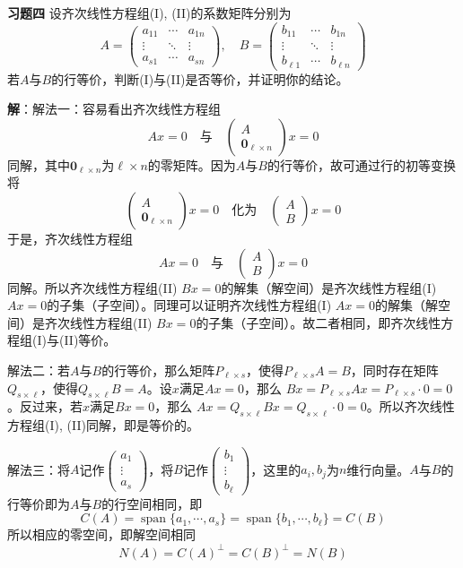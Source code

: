 \newpageorvspace

{\bf 习题四} 设齐次线性方程组(I), (II)的系数矩阵分别为
$$A = \begin{pmatrix} a_{11} & \cdots & a_{1n} \\ \vdots & \ddots & \vdots \\ a_{s1} & \cdots & a_{sn} \end{pmatrix}, \quad B = \begin{pmatrix} b_{11} & \cdots & b_{1n} \\ \vdots & \ddots & \vdots \\ b_{\ell 1} & \cdots & b_{\ell n} \end{pmatrix}$$
若$A$与$B$的行等价，判断(I)与(II)是否等价，并证明你的结论。

{\bf 解}：解法一：容易看出齐次线性方程组
$$Ax = 0 \quad \text{与} \quad \begin{pmatrix} A \\ \mathbf{0}_{\ell\times n} \end{pmatrix} x = 0$$
同解，其中$\mathbf{0}_{\ell\times n}$为$\ell\times n$的零矩阵。因为$A$与$B$的行等价，故可通过行的初等变换将
$$\begin{pmatrix} A \\ \mathbf{0}_{\ell\times n} \end{pmatrix} x = 0 \quad \text{化为} \quad \begin{pmatrix} A \\ B \end{pmatrix} x = 0$$
于是，齐次线性方程组
$$Ax = 0 \quad \text{与} \quad \begin{pmatrix} A \\ B \end{pmatrix} x = 0$$
同解。所以齐次线性方程组(II) $Bx = 0$的解集（解空间）是齐次线性方程组(I) $Ax = 0$的子集（子空间）。同理可以证明齐次线性方程组(I) $Ax = 0$的解集（解空间）是齐次线性方程组(II) $Bx = 0$的子集（子空间）。故二者相同，即齐次线性方程组(I)与(II)等价。

解法二：若$A$与$B$的行等价，那么矩阵$P_{\ell\times s}$，使得$P_{\ell\times s}A = B$，同时存在矩阵$Q_{s\times \ell}$，使得$Q_{s\times \ell}B = A$。设$x$满足$Ax = 0$，那么
$Bx = P_{\ell\times s}Ax = P_{\ell\times s}\cdot 0 = 0$。反过来，若$x$满足$Bx = 0$，那么
$Ax = Q_{s\times \ell}Bx = Q_{s\times \ell}\cdot 0 = 0$。所以齐次线性方程组(I), (II)同解，即是等价的。

解法三：将$A$记作$\begin{pmatrix} a_1 \\ \vdots \\ a_s \end{pmatrix}$，将$B$记作$\begin{pmatrix} b_1 \\ \vdots \\ b_{\ell} \end{pmatrix}$，这里的$a_i, b_j$为$n$维行向量。$A$与$B$的行等价即为$A$与$B$的行空间相同，即
$$C(A) = \operatorname{span}\{a_1, \cdots, a_s\} = \operatorname{span}\{b_1, \cdots, b_{\ell}\} = C(B)$$
所以相应的零空间，即解空间相同
$$N(A) = C(A)^{\perp} = C(B)^{\perp} = N(B)$$

